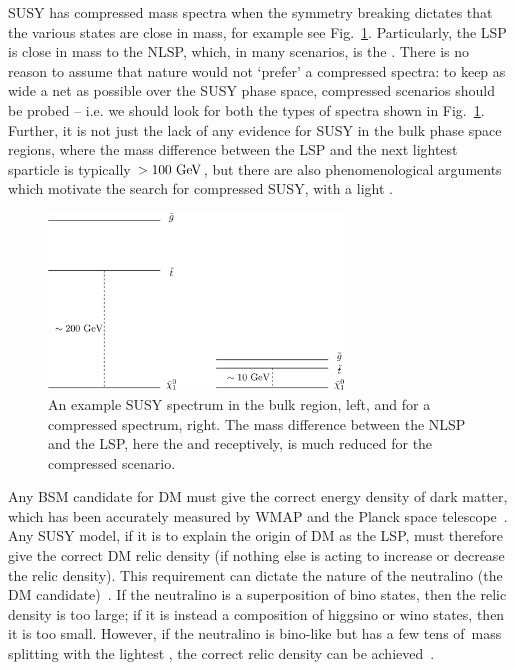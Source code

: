 \ac{SUSY} has compressed mass spectra when the symmetry breaking dictates that the various states are close in mass, for example see Fig.~\ref{fig:compSUSYspec}. 
Particularly, the \ac{LSP} is close in mass to the \ac{NLSP}, which, 
in many scenarios, is the \sTop{}. 
There is no reason to assume that nature would not `prefer' a compressed spectra: to keep as wide a net as possible over the \ac{SUSY} phase space, compressed scenarios should be probed -- i.e. we should look for both the types of spectra shown in Fig.~\ref{fig:compSUSYspec}.
Further, it is not just the lack of any evidence for \ac{SUSY} in the bulk phase space regions, 
where the mass difference between the \ac{LSP} and the next lightest sparticle is typically $>100~\mathrm{GeV}$, 
but there are also phenomenological arguments which motivate the search for compressed \ac{SUSY}, with a light \sTop.
%
\begin{figure}[t!]
  \begin{center}
  \includegraphics[width=0.7\textwidth]{Figures/theory/susyCompressedSpectra.pdf}
  \caption{An example \ac{SUSY} spectrum in the bulk region, left, and for a compressed spectrum, right. The mass difference between the \ac{NLSP} and the \ac{LSP}, here the \sTop{} and \chiOneZero receptively, is much reduced for the compressed scenario.}
  \label{fig:compSUSYspec}
  \end{center}
\end{figure}

Any \ac{BSM} candidate for \ac{DM} must give the correct energy density of dark matter, which has been accurately measured by \ac{WMAP} and the Planck space telescope~\cite{WMAP2003,Planck2013}.
Any \ac{SUSY} model, if it is to explain the origin of \ac{DM} as the \ac{LSP}, must therefore give the correct \ac{DM} relic density (if nothing else is acting to increase or decrease the relic density). 
This requirement can dictate the nature of the neutralino (the \ac{DM} candidate)~\cite{CompSUSY1,CompSUSY2}.
If the neutralino is a superposition of bino states, then the relic density is too large; if it is instead a composition of higgsino or wino states, then it is too small.
However, if the neutralino is bino-like but has a few tens of~\GeV mass splitting with the lightest \sTop{}, the correct relic density can be achieved~\cite{CompSUSY6,CompSUSY9,CompSUSY10}.

